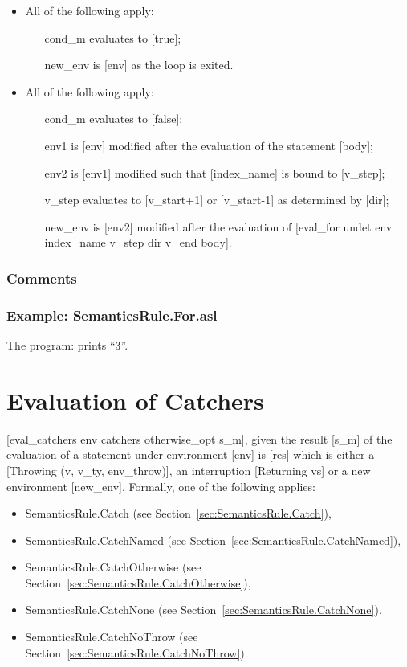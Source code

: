 \documentclass{book}
\begin{document}
    \begin{itemize}
    \item All of the following apply:
      \begin{itemize}
      \item [cond\_m] evaluates to [true];
      \item [new\_env] is [env] as the loop is exited.
      \end{itemize}
    \item All of the following apply:
      \begin{itemize}
      \item [cond\_m] evaluates to [false];
      \item [env1] is [env] modified after the evaluation of the statement [body];
      \item [env2] is [env1] modified such that [index\_name] is bound to [v\_step];
      \item [v\_step] evaluates to [v\_start+1] or [v\_start-1] as determined by [dir];
      \item [new\_env] is [env2] modified after the evaluation of [eval\_for undet
        env index\_name v\_step dir v\_end body].
      \end{itemize}
    \end{itemize}

    \subsubsection{Comments}

    \subsubsection{Example: SemanticsRule.For.asl}
    The program:
    prints ``3''.

\section{Evaluation of Catchers}
[eval\_catchers env catchers otherwise\_opt s\_m], given the result [s\_m] of the
evaluation of a statement under environment [env] is [res] which is either a
[Throwing (v, v\_ty, env\_throw)], an interruption [Returning vs] or a new
environment [new\_env]. Formally, one of the following applies:
\begin{itemize}
\item SemanticsRule.Catch (see Section~\ref{sec:SemanticsRule.Catch}),
\item SemanticsRule.CatchNamed (see Section~\ref{sec:SemanticsRule.CatchNamed}),
\item SemanticsRule.CatchOtherwise (see Section~\ref{sec:SemanticsRule.CatchOtherwise}),
\item SemanticsRule.CatchNone (see Section~\ref{sec:SemanticsRule.CatchNone}),
\item SemanticsRule.CatchNoThrow (see Section~\ref{sec:SemanticsRule.CatchNoThrow}).
\end{itemize}
\end{document}
